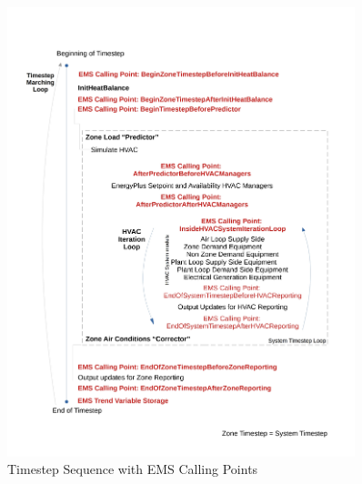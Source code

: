 \begin{figure}[hbtp] %
\centering
\includegraphics[width=0.9\textwidth, height=0.9\textheight, keepaspectratio=true]{media/image004.jpg}
\caption{Timestep Sequence with EMS Calling Points \protect \label{fig:timestep-sequence-with-ems-calling-points}}
\end{figure}

